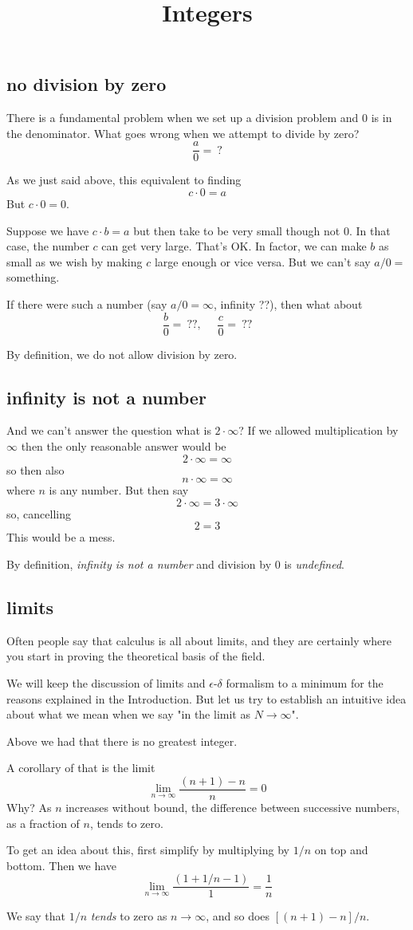 \documentclass[11pt, oneside]{article}
\title{Integers}
\date{}
\begin{document}
\maketitle
\Large

\subsection*{no division by zero}
There is a fundamental problem when we set up a division problem and $0$ is in the denominator.  What goes wrong when we attempt to divide by zero?
\[ \frac{a}{0} = \ ? \]

As we just said above, this equivalent to finding
\[ c \cdot 0 = a \]
But $c \cdot 0 = 0$.

Suppose we have $c \cdot b = a$ but then take to be very small though not 0.  In that case, the number $c$ can get very large.  That's OK.  In factor, we can make $b$ as small as we wish by making $c$ large enough or vice versa.  But we can't say $a/0 = $ something.

If there were such a number (say $a/0 = \infty$, infinity ??), then what about 
\[ \frac{b}{0} = \ ??, \ \ \ \ \ \ \frac{c}{0} = \ ??  \]

By definition, we do not allow division by zero.

\subsection*{infinity is not a number}

And we can't answer the question what is $2 \cdot \infty$?  If we allowed multiplication by $\infty$ then the only reasonable answer would be
\[ 2 \cdot \infty = \infty \]
so then also
\[ n \cdot \infty = \infty \]
where $n$ is any number.  But then say
\[ 2 \cdot \infty = 3 \cdot \infty \]
so, cancelling
\[ 2 = 3 \]
This would be a mess.

By definition, \emph{infinity is not a number} and division by $0$ is \emph{undefined}.

\subsection*{limits}
Often people say that calculus is all about limits, and they are certainly where you start in proving the theoretical basis of the field.  

We will keep the discussion of limits and $\epsilon$-$\delta$ formalism to a minimum for the reasons explained in the Introduction.  But let us try to establish an intuitive idea about what we mean when we say "in the limit as $N \rightarrow \infty$".

Above we had that there is no greatest integer.

A corollary of that is the limit
\[ \lim_{n \rightarrow \infty} \frac{(n + 1) - n}{n} = 0 \]
Why?  As $n$ increases without bound, the difference between successive numbers, as a fraction of $n$, tends to zero.

To get an idea about this, first simplify by multiplying by $1/n$ on top and bottom.  Then we have
\[ \lim_{n \rightarrow \infty} \frac{(1 + 1/n - 1)}{1} = \frac{1}{n} \]

We say that $1/n$ \emph{tends} to zero as $n \rightarrow \infty$, and so does $[(n+1)-n]/n$.
\end{document}
